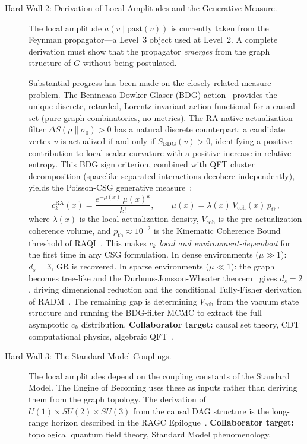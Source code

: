 \documentclass[11pt,a4paper]{article}
\theoremstyle{plain}
\theoremstyle{definition}
\theoremstyle{remark}
\begin{document}
\begin{description}
  \item[Hard Wall 2: Derivation of Local Amplitudes and the Generative Measure.]
  The local amplitude $a(v \mid \mathrm{past}(v))$ is currently taken from
  the Feynman propagator---a Level~3 object used at Level~2. A complete
  derivation must show that the propagator \emph{emerges} from the graph
  structure of $G$ without being postulated.

  Substantial progress has been made on the closely related measure problem.
  The Benincasa-Dowker-Glaser (BDG) action~\citep{Benincasa2010} provides the
  unique discrete, retarded, Lorentz-invariant action functional for a causal
  set (pure graph combinatorics, no metrics). The RA-native actualization filter
  $\Delta S(\rho\|\sigma_0) > 0$ has a natural discrete counterpart: a candidate
  vertex $v$ is actualized if and only if $S_{\mathrm{BDG}}(v) > 0$, identifying
  a positive contribution to local scalar curvature with a positive increase in
  relative entropy. This BDG sign criterion, combined with QFT cluster
  decomposition (spacelike-separated interactions decohere independently), yields
  the Poisson-CSG generative measure~\citep{Sandeman2026b}:
  \begin{equation}
    c_k^{\mathrm{RA}}(x) = \frac{e^{-\mu(x)}\,\mu(x)^k}{k!},
    \qquad
    \mu(x) = \lambda(x)\,V_{\mathrm{coh}}(x)\,p_{\mathrm{th}},
  \end{equation}
  where $\lambda(x)$ is the local actualization density, $V_{\mathrm{coh}}$ is
  the pre-actualization coherence volume, and $p_{\mathrm{th}} \approx 10^{-2}$
  is the Kinematic Coherence Bound threshold of RAQI~\citep{Sandeman2026d}.
  This makes $c_k$ \emph{local and environment-dependent} for the first time in
  any CSG formulation. In dense environments ($\mu \gg 1$): $d_s = 3$, GR is
  recovered. In sparse environments ($\mu \ll 1$): the graph becomes tree-like
  and the Durhuus-Jonsson-Wheater theorem~\citep{Durhuus2010} gives $d_s = 2$,
  driving dimensional reduction and the conditional Tully-Fisher derivation of
  RADM~\citep{Sandeman2026RADM}. The remaining gap is determining $V_{\mathrm{coh}}$
  from the vacuum state structure and running the BDG-filter MCMC to extract
  the full asymptotic $c_k$ distribution.
  \textbf{Collaborator target:} causal set theory, CDT computational physics,
  algebraic QFT~\citep{Dowker2005,RideoutSorkin2000}.

  \item[Hard Wall 3: The Standard Model Couplings.]
  The local amplitudes depend on the coupling constants of the Standard Model.
  The Engine of Becoming uses these as inputs rather than deriving them from
  the graph topology. The derivation of $U(1) \times SU(2) \times SU(3)$ from
  the causal DAG structure is the long-range horizon described in the RAGC
  Epilogue~\citep{Sandeman2026b}.
  \textbf{Collaborator target:} topological quantum field theory, Standard
  Model phenomenology.
\end{description}
\end{document}
